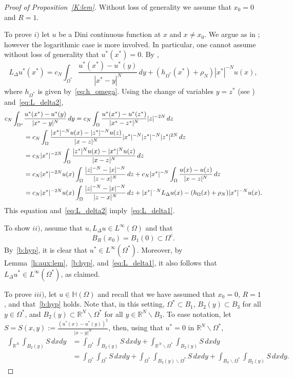 \documentclass[11pt]{article}
\newcommand{\R}{\mathbb{R}}
\numberwithin{equation}{section}
\begin{document}
\begin{proof}[Proof of Proposition~\ref{K:lem}]
Without loss of generality we assume that $x_0=0$ and $R=1$.

To prove $i)$ let $u$ be a Dini continuous function at $x$ and $x\neq x_0$.  We argue as in \cite[Proposition A.1]{RS14}; however the logarithmic case is more involved.  In particular, one cannot assume without loss of generality that $u^*(x^*)=0$. By \cite[Proposition 2.2]{CW19},
\begin{equation} \label{eq:L_delta2}
L_\Delta u^*(x^*)=c_N\int_{\Omega^*}\frac{u^*(x^*)- u^*(y)}{|x^*-y|^N}\, dy + (h_{\Omega^*}(x^*)+\rho_N) |x^*|^{-N}u(x),
\end{equation}
where $h_{\Omega^*}$ is given by~\eqref{eq:h_omega}. Using the change of variables $y=z^*$ (see \cite[Proposition A.3]{B16}) and~\eqref{eq:L_delta2},
  \begin{align*}
c_N \int_{\Omega^*} &\frac{u^*(x^*) - u^*(y)}{|x^*-y|^N}\, dy= c_N \int_{\Omega} \frac{u^*(x^*) - u^*(z^*)}{|x^*-z^*|^N} |z|^{-2N}\, dz \notag\\
&= c_N\int_{\Omega} \frac{|x^*|^{-N} u(x) - |z^*|^{-N} u(z)}{|x-z|^N}|x^*|^{-N}|z^*|^{-N} |z^*|^{2N}\, dz \notag\\
&=c_N |x^*|^{-2N} \int_{\Omega} \frac{|z^*|^Nu(x) - |x^*|^Nu(z)}{|x-z|^N}\, dz \notag\\
&= c_N |x^*|^{-2N}u(x) \int_{\Omega}\frac{|z|^{-N}-|x|^{-N}}{|z-x|^N}\, dz
+ c_N |x^*|^{-N} \int_{\Omega}\frac{u(x)-u(z)}{|x-z|^N}\, dz  \notag\\
&= c_N |x^*|^{-2N}u(x) \int_{\Omega}\frac{|z|^{-N}-|x|^{-N}}{|z-x|^N}\, dz + |x^*|^{-N} L_\Delta u(x) - (h_\Omega(x)+\rho_N)|x^*|^{-N}u(x).
 \end{align*}
 This equation and~\eqref{eq:L_delta2} imply~\eqref{eq:L_delta1}.

To show $ii)$, assume that $u,L_\Delta u \in L^\infty(\Omega)$ and that 
\begin{align}\label{b:hyp}
B_R(x_0)=B_1(0) \subset \Omega^c.    
\end{align}
 By~\eqref{b:hyp}, it is clear that $u^*\in L^\infty(\Omega^*)$. Moreover, by Lemma~\ref{h:aux:lem},~\eqref{b:hyp}, and~\eqref{eq:L_delta1}, it also follows that $L_\Delta u^* \in L^\infty (\Omega^*)$, as claimed.

To prove $iii)$, let $u \in \mathbb{H}(\Omega)$ and recall that we have assumed that $x_0=0$, $R=1$, and that~\eqref{b:hyp} holds.  Note that, in this setting, $\Omega^*\subset B_1$, $B_2(y)\subset B_3$ for all $y\in \Omega^*$, and $B_2(y)\subset \R^N\backslash \Omega^*$ for all $y\in \R^N\backslash B_3$. To ease notation, let $S=S(x,y):=\frac{\left( u^*(x)-u^*(y)\right)^2}{|x-y|^N}$, then, using that $u^*=0$ in $\R^N\backslash \Omega^*$,
\begin{align*}
\int_{\R^N}\int_{B_2(y)}S \, dx dy
&=\int_{\Omega^*}\int_{B_2(y)}S \, dx dy
+\int_{\R^N\backslash \Omega^*}\int_{B_2(y)}S \, dx dy\\
&=\int_{\Omega^*}\int_{\Omega^*}S \, dx dy
+\int_{\Omega^*}\int_{B_2(y)\backslash \Omega^*}S \, dx dy
+\int_{B_3\backslash \Omega^*}\int_{B_2(y)}S \, dx dy.
\end{align*}


\end{proof}
\end{document}
